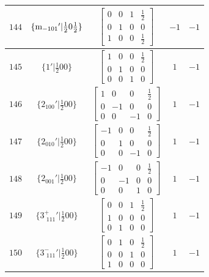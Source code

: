 \documentclass[fleqn,8pt]{jsarticle}
\begin{document}
\begin{longtable}{ccccc}
$ 144 $ & $ \{{\rm m}_{-101}{}'|\frac{1}{2} 0 \frac{1}{2}\} $ & $ \begin{bmatrix} 0 & 0 & 1 & \frac{1}{2} \\ 0 & 1 & 0 & 0 \\ 1 & 0 & 0 & \frac{1}{2} \end{bmatrix} $ & $ -1 $ & $ -1 $ \\ \hline
$ 145 $ & $ \{1{}'|\frac{1}{2} 0 0\} $ & $ \begin{bmatrix} 1 & 0 & 0 & \frac{1}{2} \\ 0 & 1 & 0 & 0 \\ 0 & 0 & 1 & 0 \end{bmatrix} $ & $ 1 $ & $ -1 $ \\ \hline
$ 146 $ & $ \{2{}_{100}{}'|\frac{1}{2} 0 0\} $ & $ \begin{bmatrix} 1 & 0 & 0 & \frac{1}{2} \\ 0 & -1 & 0 & 0 \\ 0 & 0 & -1 & 0 \end{bmatrix} $ & $ 1 $ & $ -1 $ \\ \hline
$ 147 $ & $ \{2{}_{010}{}'|\frac{1}{2} 0 0\} $ & $ \begin{bmatrix} -1 & 0 & 0 & \frac{1}{2} \\ 0 & 1 & 0 & 0 \\ 0 & 0 & -1 & 0 \end{bmatrix} $ & $ 1 $ & $ -1 $ \\ \hline
$ 148 $ & $ \{2{}_{001}{}'|\frac{1}{2} 0 0\} $ & $ \begin{bmatrix} -1 & 0 & 0 & \frac{1}{2} \\ 0 & -1 & 0 & 0 \\ 0 & 0 & 1 & 0 \end{bmatrix} $ & $ 1 $ & $ -1 $ \\ \hline
$ 149 $ & $ \{3^{+}_{\,\,111}{}'|\frac{1}{2} 0 0\} $ & $ \begin{bmatrix} 0 & 0 & 1 & \frac{1}{2} \\ 1 & 0 & 0 & 0 \\ 0 & 1 & 0 & 0 \end{bmatrix} $ & $ 1 $ & $ -1 $ \\ \hline
$ 150 $ & $ \{3^{-}_{\,\,111}{}'|\frac{1}{2} 0 0\} $ & $ \begin{bmatrix} 0 & 1 & 0 & \frac{1}{2} \\ 0 & 0 & 1 & 0 \\ 1 & 0 & 0 & 0 \end{bmatrix} $ & $ 1 $ & $ -1 $ \\ \hline

\end{longtable}
\end{document}
